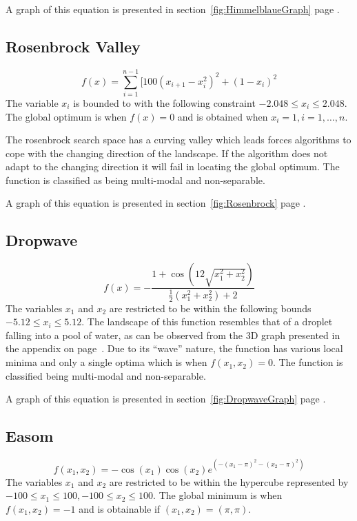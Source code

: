 A graph of this equation is presented in section~\ref{fig:HimmelblaueGraph} page \pageref{fig:HimmelblaueGraph}.
\subsection{Rosenbrock Valley}
\begin{equation}
	f(x) = \sum_{i=1}^{n-1}[100(x_{i+1} - x_i^2)^2 + (1-x_i)^2
\end{equation}
The variable $x_i$ is bounded to with the following constraint $ -2.048 \leq x_i \leq 2.048 $\cite{numericalABC,ABCCompareStudy,ARPSO,PerfABC,TSGlobalOptContinFunc,HybridIntelliGA}. The global optimum is when $f(x) = 0$ and is obtained when $x_i = 1, i = 1,\ldots,n$\cite{numericalABC,ABCCompareStudy,ARPSO,TSGlobalOptContinFunc,HybridIntelliGA}.

The rosenbrock search space has a curving valley which leads forces algorithms to cope with the changing direction of the landscape\cite{numericalABC,ABCCompareStudy,ChaoticABC,PerfABC,HybridIntelliGA}. If the algorithm does not adapt to the changing direction it will fail in locating the global optimum. The function is classified as being multi-modal and non-separable\cite{numericalABC,ABCCompareStudy,ChaoticABC,PerfABC,HybridIntelliGA}.

A graph of this equation is presented in section~\ref{fig:Rosenbrock} page \pageref{fig:Rosenbrock}.
\subsection{Dropwave}
\begin{equation}
	f(x) = -\frac{1 + \cos{(12\sqrt{x_1^2 + x_2^2})}}{\frac{1}{2}(x_1^2 + x_2^2) + 2}
\end{equation}
The variables $x_1$ and $x_2$ are restricted to be within the following bounds $-5.12 \leq x_i \leq 5.12$\cite{TestFunctions}. The landscape of this function resembles that of a droplet falling into a pool of water, as can be observed from the 3D graph presented in the appendix on page~\pageref{fig:DropwaveGraph}. Due to its ``wave'' nature, the function has various local minima and only a single optima which is when $f(x_1,x_2) = 0$. The function is classified being multi-modal and non-separable\cite{TestFunctions}.

A graph of this equation is presented in section~\ref{fig:DropwaveGraph} page \pageref{fig:DropwaveGraph}.
\subsection{Easom}
\begin{equation}
	f(x_1,x_2) = -\cos(x_1)\cos(x_2)e^{(-(x_1 - \pi)^2 - (x_2 - \pi)^2)}
\end{equation}
The variables $x_1$ and $x_2$ are restricted to be within the hypercube represented by $-100 \leq x_1 \leq 100, -100 \leq x_2 \leq 100$\cite{TSGlobalOptContinFunc,ContinACSTS,TestFunctions}. The global minimum is when $f(x_1,x_2) = -1$ and is obtainable if $(x_1,x_2) = (\pi,\pi)$\cite{TSGlobalOptContinFunc,ContinACSTS,TestFunctions}. 

